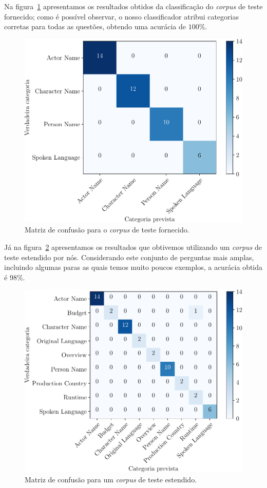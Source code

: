 \documentclass[a4paper,twocolumn]{article}
\begin{document}
Na figura~\ref{fig:conf1} apresentamos os resultados obtidos da classificação do \textit{corpus} de teste fornecido; como é possível observar, o nosso classificador atribui categorias corretas para todas as questões, obtendo uma acurácia de $100\%$.
\medskip

\begin{figure}[h]
	\centering
	\includegraphics[width=\linewidth]{cm1.pdf}
	\caption{Matriz de confusão para o \textit{corpus} de teste fornecido.}
	\label{fig:conf1}
\end{figure}

Já na figura~\ref{fig:conf2} apresentamos os resultados que obtivemos utilizando um \textit{corpus} de teste estendido por nós. Considerando este conjunto de perguntas mais amplas, incluindo algumas paras as quais temos muito poucos exemplos, a acurácia obtida é $98\%$.

\begin{figure}[h]
	\centering
	\includegraphics[width=\linewidth]{cm2.pdf}
	\caption{Matriz de confusão para um \textit{corpus} de teste estendido.}
	\label{fig:conf2}
\end{figure}
\end{document}

